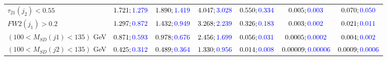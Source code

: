 \begin{landscape}
\begin{table}
\begin{tabular}{lcccccc}
				\rowcolor{black!7}$\tau_{21}(j_2)<0.55$ &$1.721;\textcolor{blue}{1.279}$ &$1.890;\textcolor{blue}{1.419}$ &$4.047;\textcolor{blue}{3.028}$&$0.550;\textcolor{blue}{0.334}$&$0.005;\textcolor{blue}{0.003}$&$0.070;\textcolor{blue}{0.050}$\\
				$FW2(j_1)>0.2$ &$1.297;\textcolor{blue}{0.872}$ &$1.432;\textcolor{blue}{0.949}$&$3.268;\textcolor{blue}{2.239}$&$0.326;\textcolor{blue}{0.183}$&$0.003;\textcolor{blue}{0.002}$&$0.021;\textcolor{blue}{0.011}$\\
				\rowcolor{black!7}$(100<M_{SD}(j1)<135)$ GeV& $0.871;\textcolor{blue}{0.593}$&$0.978;\textcolor{blue}{0.676}$&$2.456;\textcolor{blue}{1.699}$&$0.056;\textcolor{blue}{0.031}$&$0.0005;\textcolor{blue}{0.0002}$&$0.004;\textcolor{blue}{0.002}$\\
				$(100<M_{SD}(j2)<135)$ GeV &$0.425;\textcolor{blue}{0.312}$ &$0.489;\textcolor{blue}{0.364}$ &$1.330;\textcolor{blue}{0.956}$&$0.014;\textcolor{blue}{0.008}$&$0.00009;\textcolor{blue}{0.00006}$&$0.0009;\textcolor{blue}{0.0006}$\\
				\bottomrule
			\end{tabular}
		\end{table}


\end{landscape}
